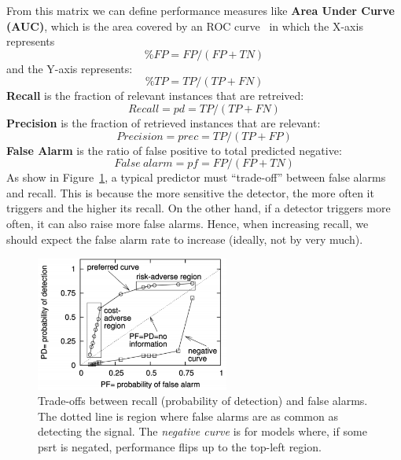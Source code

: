 \documentclass[10pt,conference]{IEEEtran}
\theoremstyle{break}
\theoremstyle{break}
\begin{document}
From this matrix  we can define performance measures like   \textbf{Area Under Curve (AUC)}, which 
is the area covered by an ROC curve~\cite{swets1988measuring, duda2012pattern} in which the X-axis represents
\[\%\mathit{FP} = \mathit{FP}/(\mathit{FP} + \mathit{TN})\]
and the Y-axis represents:
\[\%\mathit{TP} = \mathit{TP}/(\mathit{TP} + \mathit{FN})\]
\textbf{Recall}  is the fraction of  relevant instances that are retreived:
\[Recall= pd  = \mathit{TP}/(\mathit{TP} + \mathit{FN})\]
 \textbf{Precision} is the fraction of retrieved instances that are relevant:
\[Precision  = prec = \mathit{TP}/(\mathit{TP} + \mathit{FP})\]
\textbf{False Alarm} is the ratio of false positive to total predicted negative:
\[False\ alarm = pf  = \mathit{FP}/(\mathit{FP} + \mathit{TN})\]
As show in Figure~\ref{fig:trade},
a typical predictor must ``trade-off''
between false alarms and recall.
This is because the  more sensitive the detector, the more often it triggers and the higher its recall. On the other hand,  if a detector triggers more often, it can also raise more false alarms.
Hence, when increasing recall, we  should  expect
the false alarm rate to  increase
(ideally, not by very much).


\begin{figure}[!b]
\begin{center}
\includegraphics[width=2.5in]{roc.png}
\end{center}
\caption{Trade-offs between
recall (probability of detection) and false alarms. The dotted line is region where false alarms are as common as detecting the signal.
The {\em negative curve} is for models where, if some psrt is negated, performance flips up to the top-left region. }\label{fig:trade}
\end{figure}
\end{document}
